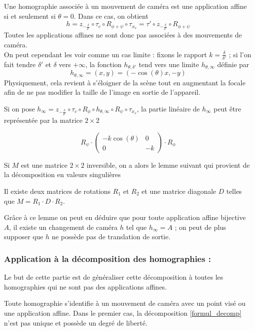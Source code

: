 \begin{Remaffin}
Une homographie associée à un mouvement de caméra est une application affine si et seulement si $\theta=0$. Dans ce cas, on obtient  
\begin{equation*}
h=z_{-\frac{\delta}{\delta'}} \circ \tau_c \circ R_{\phi+\psi} \circ \tau_{x_{v}}
=\tau' \circ z_{-\frac{\delta}{\delta'}} \circ  R_{\phi+\psi}
\end{equation*}
Toutes les applications affines ne sont donc pas associées à des mouvements de caméra.\\
On peut cependant les voir comme un cas limite : fixons le rapport  $k=\frac{\delta}{\delta'}$ ; si l'on fait tendre $\delta'$ et $\delta$ vers $+\infty$, la fonction $h_{\theta,\delta'}$ tend vers une limite $h_{\theta,\infty}$ définie par
\begin{equation*}
h_{\theta,\infty}=(x,y)=(-\cos(\theta)x,-y)
\end{equation*}
Physiquement, cela revient à s'éloigner de la scène tout en augmentant la focale afin de ne pas modifier la taille de l'image en sortie de l'appareil.

Si on pose $h_\infty = z_{-\frac{\delta}{\delta'}} \circ \tau_c \circ R_{\phi} \circ h_{\theta,\infty} \circ R_{\psi} \circ \tau_{x_{v}}$, la partie linéaire de $h_{\infty}$ peut être représentée par la matrice $2\times2$

\begin{equation*}
R_{\psi} \cdot 
\begin{pmatrix}
-k\cos(\theta)&0\\
0&-k
\end{pmatrix}
\cdot R_{\phi}
\end{equation*}

Si  $M$ est une matrice $2\times 2$ inversible, on a alors le lemme suivant qui provient de la décomposition en valeurs singulières \cite{morel2009asift}
\begin{lem}
Il existe deux matrices de rotations $R_1$ et $R_2$  et une matrice diagonale $D$ telles que $M = R_1 \cdot D \cdot R_2$.
\end{lem}
Grâce à ce lemme on peut en déduire que pour toute application affine bijective $A$, il existe un changement de caméra $h$ tel que $h_\infty = A$ ; on peut de plus supposer que $h$ ne possède pas de translation de sortie.
\end{Remaffin}


\subsubsection{Application à la décomposition des homographies :}
Le but de cette partie est de généraliser cette décomposition à toutes les homographies qui ne sont pas des applications affines.
\begin{prop}
Toute homographie s'identifie à un mouvement de caméra avec un point visé ou une application affine. Dans le premier cas, la décomposition \ref{formul_decomp} n'est pas unique et possède un degré de liberté.
\label{thepropdecomp}
\end{prop}
